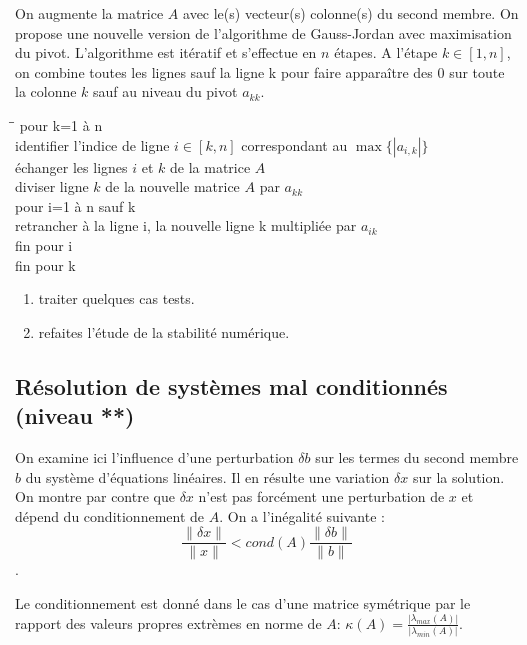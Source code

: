 \documentclass[a4paper, 10pt]{article}
\newcommand{\norm}[1]{\lVert#1\rVert}
\begin{document}
On augmente la matrice $A$ avec le(s) vecteur(s) colonne(s) du second membre.
On propose une nouvelle version de l'algorithme de Gauss-Jordan
avec maximisation du pivot.
L'algorithme est itératif et s'effectue en $n$ étapes. A l'étape $k \in [1, n]$, on
combine toutes les lignes sauf la ligne k pour faire apparaître des $0$ sur toute
la colonne $k$ sauf au niveau du pivot $a_{kk}$.

\begin{tabbing}
\hspace{1cm}\= \hspace{1cm}\= \kill
pour k=1 à n \\
\> identifier l'indice de ligne $i \in [k, n]$  correspondant au $\max \{|a_{i,k}|\}$  \\
\> échanger les lignes $i$ et $k$ de la matrice $A$ \\
\> diviser ligne $k$ de la nouvelle matrice $A$ par $a_{kk}$ \\
\> pour i=1 à n sauf k \\
\> \> retrancher à la ligne i, la nouvelle ligne k multipliée par $a_{ik}$ \\
\> fin pour i \\
fin pour k \\
\end{tabbing}
 
 \begin{enumerate} 
 \item traiter quelques cas tests.
 \item refaites l'étude de la stabilité numérique.
 \end{enumerate}
 
 \subsection{Résolution de systèmes mal conditionnés (niveau **)}
 
 On examine ici l'influence d'une perturbation $\delta b$ sur les termes du second membre $b$
 du  système d'équations linéaires. Il en résulte une variation $\delta x$ sur la solution.
 On montre par contre que $\delta x$ n'est pas forcément une perturbation de $x$ et
 dépend du conditionnement de $A$.
 On a l'inégalité suivante : 
 \begin{equation}
 \frac{\norm {\delta x}}{\norm x} < cond(A) \frac{\norm {\delta b}}{\norm b}
 \label{conderr}
 \end{equation}.
 
Le conditionnement est donné dans le cas d'une matrice symétrique
 par le rapport des valeurs propres  extrèmes en norme de $A$:
 $\kappa(A) = \frac{|\lambda_{max}(A)|}{|\lambda_{min}(A)|}$.
 
\end{document}
